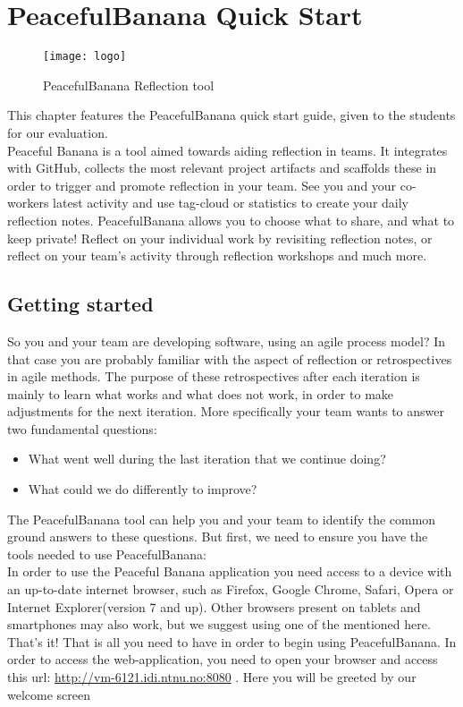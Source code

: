 \newpage
\thispagestyle{empty}
\mbox{}
\chapter{PeacefulBanana Quick Start}

\begin{figure}[h!]
\label{logo}
\centering
	\texttt{[image: logo]}
\caption{PeacefulBanana Reflection tool}
\end{figure}

This chapter features the PeacefulBanana quick start guide, given to the students for our evaluation. \\
Peaceful Banana is a tool aimed towards aiding reflection in teams. It integrates with GitHub, collects the most relevant project artifacts and scaffolds these in order to trigger and promote reflection in your team.
See you and your co-workers latest activity and use tag-cloud or statistics to create your daily reflection notes. PeacefulBanana allows you to choose what to share, and what to keep private! Reflect on your individual work by revisiting reflection notes, or reflect on your team's activity through reflection workshops and much more. 
\pagebreak

\section{Getting started}
So you and your team are developing software, using an agile process model? In that case you are probably familiar with the aspect of reflection or retrospectives in agile methods. The purpose of these retrospectives after each iteration is mainly to learn what works and what does not work, in order to make adjustments for the next iteration. More specifically your team wants to answer two fundamental questions:
\begin{itemize}
\item What went well during the last iteration that we continue doing? 
\item What could we do differently to improve?
\end{itemize}

The PeacefulBanana tool can help you and your team to identify the common ground answers to these questions. But first, we need to ensure you have the tools needed to use PeacefulBanana: \\
In order to use the Peaceful Banana application you need access to a device with an up-to-date internet browser, such as Firefox, Google Chrome, Safari, Opera or Internet Explorer(version 7 and up). Other browsers present on tablets and smartphones may also work, but we suggest using one of the mentioned here. \\
That's it! That is all you need to have in order to begin using PeacefulBanana. 
In order to access the web-application, you need to open your browser and access this url: \url{http://vm-6121.idi.ntnu.no:8080} . Here you will be greeted by our welcome screen\\

